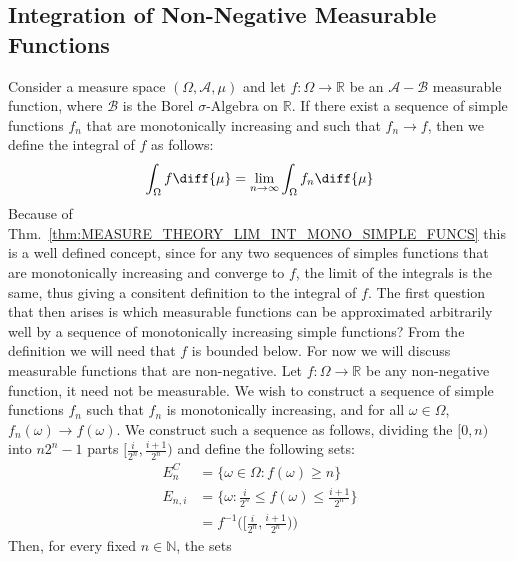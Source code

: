     \subsection{Integration of Non-Negative Measurable Functions}
        Consider a measure space $(\Omega,\mathcal{A},\mu)$ and
        let $f:\Omega\rightarrow\mathbb{R}$ be an
        $\mathcal{A}-\mathcal{B}$ measurable function, where
        $\mathcal{B}$ is the Borel $\sigma\textrm{-Algebra}$ on
        $\mathbb{R}$. If there exist a sequence of simple
        functions $f_{n}$ that are monotonically increasing
        and such that $f_{n}\rightarrow{f}$, then we define the
        integral of $f$ as follows:
        \begin{equation}
            \int_{\Omega}f\diff{\mu}=
            \underset{n\rightarrow\infty}{\lim}
            \int_{\Omega}f_{n}\diff{\mu}
        \end{equation}
        Because of
        Thm.~\ref{thm:MEASURE_THEORY_LIM_INT_MONO_SIMPLE_FUNCS}
        this is a well defined concept, since for any
        two sequences of simples functions that are monotonically
        increasing and converge to $f$, the limit of the
        integrals is the same, thus giving a consitent definition
        to the integral of $f$. The first question that then
        arises is which measurable functions can be approximated
        arbitrarily well by a sequence of monotonically
        increasing simple functions? From the definition we will
        need that $f$ is bounded below. For now we will discuss
        measurable functions that are non-negative. Let
        $f:\Omega\rightarrow\mathbb{R}$ be any non-negative
        function, it need not be measurable. We wish to construct
        a sequence of simple functions $f_{n}$ such that
        $f_{n}$ is monotonically increasing, and for all
        $\omega\in\Omega$, $f_{n}(\omega)\rightarrow{f}(\omega)$.
        We construct such a sequence as follows, dividing
        the $[0,n)$ into $n2^{n}-1$ parts
        $[\frac{i}{2^{n}},\frac{i+1}{2^{n}})$ and define the
        following sets:
        \begin{align}
            E_{n}^{C}
            &=\{\omega\in\Omega:f(\omega)\geq{n}\}\\
            E_{n,i}
            &=\{\omega:\frac{i}{2^{n}}\leq{f}(\omega)
                \leq\frac{i+1}{2^{n}}\}\\
            &=f^{-1}\big([\frac{i}{2^{n}},\frac{i+1}{2^{n}})\big)
        \end{align}
        Then, for every fixed $n\in\mathbb{N}$, the sets
